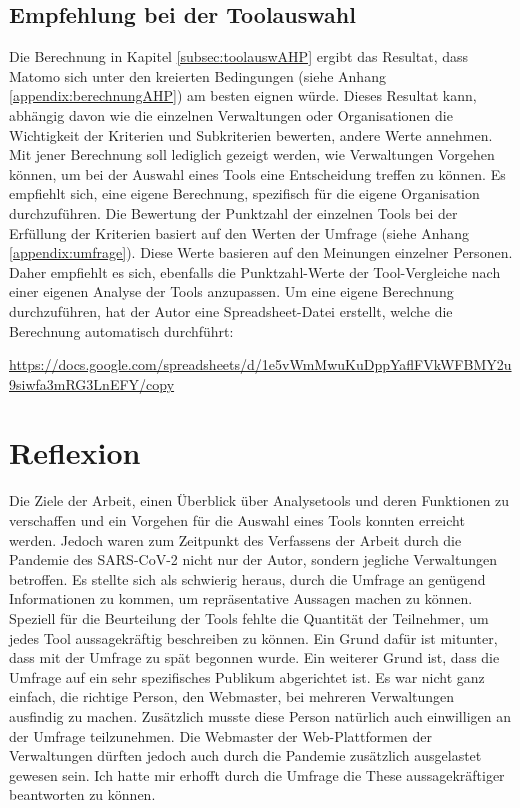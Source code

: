         \subsection{Empfehlung bei der Toolauswahl}
        Die Berechnung in Kapitel \ref{subsec:toolauswAHP} ergibt das Resultat, dass Matomo sich unter den kreierten Bedingungen (siehe Anhang \ref{appendix:berechnungAHP}) am besten eignen würde. Dieses Resultat kann, abhängig davon wie die einzelnen Verwaltungen oder Organisationen die Wichtigkeit der Kriterien und Subkriterien bewerten, andere Werte annehmen. Mit jener Berechnung soll lediglich gezeigt werden, wie Verwaltungen Vorgehen können, um bei der Auswahl eines Tools eine Entscheidung treffen zu können. Es empfiehlt sich, eine eigene Berechnung, spezifisch für die eigene Organisation durchzuführen. Die Bewertung der Punktzahl der einzelnen Tools bei der Erfüllung der Kriterien basiert auf den Werten der Umfrage (siehe Anhang \ref{appendix:umfrage}). Diese Werte basieren auf den Meinungen einzelner Personen. Daher empfiehlt es sich, ebenfalls die Punktzahl-Werte der Tool-Vergleiche nach einer eigenen Analyse der Tools anzupassen. Um eine eigene Berechnung durchzuführen, hat der Autor eine Spreadsheet-Datei erstellt, welche die Berechnung automatisch durchführt:

        \url{https://docs.google.com/spreadsheets/d/1e5vWmMwuKuDppYaflFVkWFBMY2u9siwfa3mRG3LnEFY/copy}


        \newpage

\section{Reflexion}
Die Ziele der Arbeit, einen Überblick über Analysetools und deren Funktionen zu verschaffen und ein Vorgehen für die Auswahl eines Tools konnten erreicht werden. Jedoch waren zum Zeitpunkt des Verfassens der Arbeit durch die Pandemie des SARS-CoV-2 nicht nur der Autor, sondern jegliche Verwaltungen betroffen. Es stellte sich als schwierig heraus, durch die Umfrage an genügend Informationen zu kommen, um repräsentative Aussagen machen zu können. Speziell für die Beurteilung der Tools fehlte die Quantität der Teilnehmer, um jedes Tool aussagekräftig beschreiben zu können. Ein Grund dafür ist mitunter, dass mit der Umfrage zu spät begonnen wurde. Ein weiterer Grund ist, dass die Umfrage auf ein sehr spezifisches Publikum abgerichtet ist. Es war nicht ganz einfach, die richtige Person, den Webmaster, bei mehreren Verwaltungen ausfindig zu machen. Zusätzlich musste diese Person natürlich auch einwilligen an der Umfrage teilzunehmen. Die Webmaster der Web-Plattformen der Verwaltungen dürften jedoch auch durch die Pandemie zusätzlich ausgelastet gewesen sein. Ich hatte mir erhofft durch die Umfrage die These aussagekräftiger beantworten zu können.

